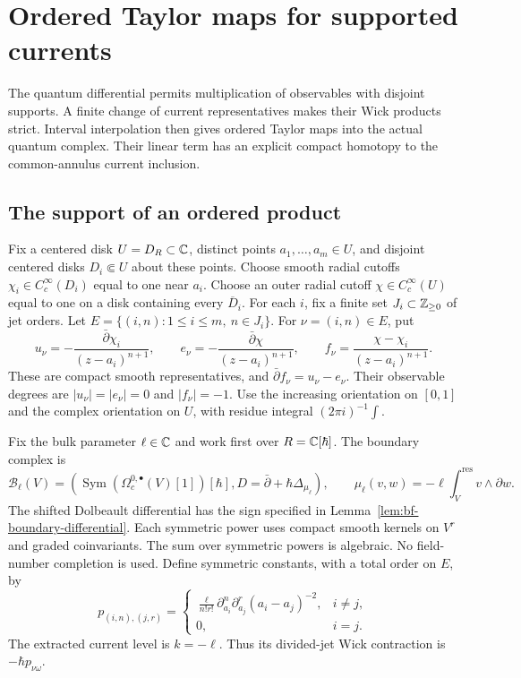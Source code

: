 \chapter{Ordered Taylor maps for supported currents}
\label{chap:ordered-current-taylor}

The quantum differential permits multiplication of observables with
disjoint supports.  A finite change of current representatives makes
their Wick products strict.  Interval interpolation then gives ordered
Taylor maps into the actual quantum complex.  Their linear term has
an explicit compact homotopy to the common-annulus current inclusion.

\section{The support of an ordered product}

Fix a centered disk $U=D_R\subset\mathbb C$, distinct points $a_1,\ldots,a_m\in U$,
and disjoint centered disks $D_i\Subset U$ about these points.
Choose smooth radial cutoffs $\chi_i\in C_c^\infty(D_i)$ equal to
one near $a_i$.  Choose an outer radial cutoff $\chi\in C_c^\infty(U)$
equal to one on a disk containing every $\overline D_i$.
For each $i$, fix a finite set $J_i\subset\mathbb Z_{\ge0}$ of jet orders.
Let $E=\{(i,n):1\le i\le m,\ n\in J_i\}$.
For $\nu=(i,n)\in E$, put
\[
 u_\nu=-\frac{\bar\partial\chi_i}{(z-a_i)^{n+1}},\qquad
 e_\nu=-\frac{\bar\partial\chi}{(z-a_i)^{n+1}},\qquad
 f_\nu=\frac{\chi-\chi_i}{(z-a_i)^{n+1}}.
\]
These are compact smooth representatives, and
$\bar\partial f_\nu=u_\nu-e_\nu$.
Their observable degrees are $|u_\nu|=|e_\nu|=0$ and $|f_\nu|=-1$.
Use the increasing orientation on $[0,1]$ and the complex orientation
on $U$, with residue integral $(2\pi i)^{-1}\int$.

Fix the bulk parameter $\ell\in\mathbb C$ and work first over
$R=\mathbb C[\hbar]$.  The boundary complex is
\[
 \mathcal B_\ell(V)
 =\left(\operatorname{Sym}(\Omega_c^{0,\bullet}(V)[1])[\hbar],
       D=\bar\partial+\hbar\Delta_{\mu_\ell}\right),\qquad
 \mu_\ell(v,w)=-\ell\int_V^{\mathrm{res}}v\wedge\partial w.
\]
The shifted Dolbeault differential has the sign specified in
Lemma~\ref{lem:bf-boundary-differential}.
Each symmetric power uses compact smooth kernels on $V^r$ and graded
coinvariants.  The sum over symmetric powers is algebraic.
No field-number completion is used.
Define symmetric constants, with a total order on $E$, by
\[
 p_{(i,n),(j,r)}=
 \begin{cases}
 \displaystyle\frac{\ell}{n!r!}
   \partial_{a_i}^{n}\partial_{a_j}^{r}(a_i-a_j)^{-2},&i\ne j,\\[3pt]
 0,&i=j.
 \end{cases}
\]
The extracted current level is $k=-\ell$.  Thus its divided-jet
Wick contraction is $-\hbar p_{\nu\omega}$.

